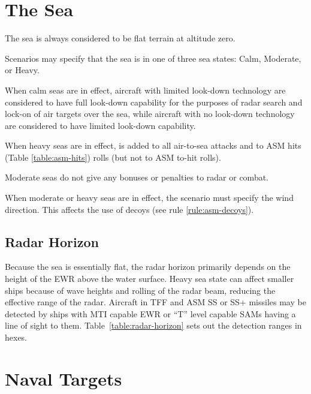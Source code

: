 

\label{rule:naval-units}

\section{The Sea}

The sea is always considered to be flat terrain at altitude zero.

Scenarios may specify that the sea is in one of three sea states: Calm, Moderate, or Heavy.

When calm seas are in effect, aircraft with limited look-down technology are considered to have full look-down capability for the purposes of radar search and lock-on of air targets over the sea, while aircraft with no look-down technology are considered to have limited look-down capability.

When heavy seas are in effect,  is added to all air-to-sea attacks and to ASM hits (Table \ref{table:asm-hits}) rolls (but not to ASM to-hit rolls).

Moderate seas do not give any bonuses or penalties to radar or combat.

When moderate or heavy seas are in effect, the scenario must specify the wind direction.  This affects the use of decoys (see rule \ref{rule:asm-decoys}).

\subsection{Radar Horizon}

Because the sea is essentially flat, the radar horizon primarily depends on the height of the EWR above the water surface.  Heavy sea state can affect smaller ships because of wave heights and rolling of the radar beam, reducing the effective range of the radar.  Aircraft in TFF and ASM SS or SS+ missiles may be detected by ships with MTI capable EWR or “T” level capable SAMs having a line of sight to them. Table~\ref{table:radar-horizon} sets out the detection ranges in hexes.



\section{Naval Targets}

